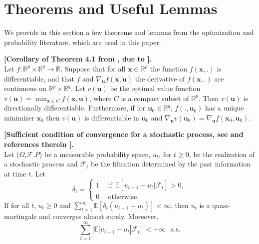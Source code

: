 \documentclass[twoside,11pt]{article}
\def\x{{\mathbf x}}
\def\as{\text{~~a.s.}}
\def\E{{\mathbb E}}
\def\u{{\mathbf u}}
\def\Real{{\mathbb R}}
\def\u{{\mathbf u}}
\begin{document}
\section{Theorems and Useful Lemmas} \label{appendix:th}
We provide in this section a few theorems and lemmas from the optimization and probability literature,
which are used in this paper.
\begin{theorem}{ \bf [Corollary of Theorem 4.1 from \citet{bonnans}, due to \citet{danskin}].\\}
   \label{theo:bonnans}
   Let $f: \Real^p \times \Real^q \to \Real$. 
   Suppose that for all $\x \in \Real^p$ the function $f(\x,.)$ is
   differentiable, and that $f$ and $\nabla_{\u}f(\x,\u)$ the derivative of
   $f(\x,.)$ are continuous on $\Real^p \times \Real^q$. Let $v(\u)$ be the
   optimal value function $v(\u) = \min_{\x \in C} f(\x,\u)$,
   where $C$ is a compact subset of $\Real^p$. Then $v(\u)$ is
   directionally differentiable.  Furthermore, if for $\u_0 \in \Real^q$,
   $f(.,\u_0)$ has a unique minimizer $\x_0$ then $v(\u)$ is differentiable in 
   $\u_0$ and $\nabla_{\u} v(\u_0) = \nabla_{\u} f (\x_0,\u_0)$.
\end{theorem}
\begin{theorem}{\bf [Sufficient condition of convergence for a stochastic process, see \citet{bottou2} and references therein \citep{metivier,fisk}].\\}
   \label{theo:martingales}
   Let ($\Omega$,$\mathcal F$,$P$) be a measurable probability space, $u_t$, for $t \geq 0$,
   be the realization of a stochastic process and ${\mathcal F}_t$ be the
   filtration determined by the past information at time $t$. Let 
   \begin{displaymath} 
      \delta_t = \left\{ 
      \begin{array}{ll}
         1 & ~~\text{if}~~ \E[u_{t+1}-u_t | {\mathcal F}_t]>0, \\
         0 & ~~\text{otherwise.}
      \end{array}
      \right.
   \end{displaymath}
   If for all $t$, $u_t \geq 0$ and $\sum_{t=1}^\infty
   \E[\delta_t(u_{t+1}-u_t)] < \infty$, then $u_t$ is a quasi-martingale and
   converges almost surely. Moreover,
   \begin{displaymath}
      \sum_{t=1}^\infty |\E[u_{t+1}-u_t | {\mathcal F}_t]| < +\infty \as 
   \end{displaymath}
\end{theorem}
\end{document}
